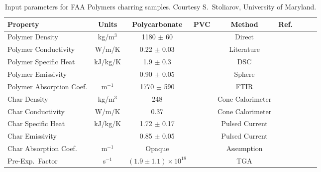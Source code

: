 \begin{table}[h!]
\caption[FAA charring polymer properties.]{Input parameters for FAA Polymers charring samples. Courtesy S.~Stoliarov, University of Maryland.}
\begin{tabular}{|l|c|c|c|c|c|c|l|l|}
\hline
Property                    & Units         & Polycarbonate                     & PVC                   & Method                &  Ref.                    \\ \hline \hline
Polymer Density             & kg/m$^3$      & 1180 $\pm$ 60                     &                       & Direct                &  \cite{Stoliarov:CF2010}  \\ \hline
Polymer Conductivity        & W/m/K         & 0.22 $\pm$ 0.03                   &                       & Literature            &  \cite{Stoliarov:CF2010}  \\ \hline
Polymer Specific Heat       & kJ/kg/K       & 1.9 $\pm$ 0.3                     &                     & DSC                   &  \cite{Stoliarov:PDS2008}  \\ \hline
Polymer Emissivity          &               & 0.90 $\pm$ 0.05                   &                     & Sphere                &  \cite{Hallman:PES1974}  \\ \hline
Polymer Absorption Coef.    & m$^{-1}$      & 1770 $\pm$ 590                    &                     & FTIR                  &  \cite{Tsilingiris:ECM2003}  \\ \hline
Char Density                & kg/m$^3$      & 248                               &                       & Cone Calorimeter      &  \cite{Stoliarov:CF2010}  \\ \hline
Char Conductivity           & W/m/K         & 0.37                              &                      & Cone Calorimeter      &  \cite{Stoliarov:CF2010}  \\ \hline
Char Specific Heat          & kJ/kg/K       & 1.72 $\pm$ 0.17                   &                    & Pulsed Current        &  \cite{Stoliarov:CF2010,Matsumoto:1996}  \\ \hline
Char Emissivity             &               & 0.85 $\pm$ 0.05                   &                       & Pulsed Current        &  \cite{Stoliarov:CF2010,Matsumoto:1996}  \\ \hline
Char Absorption Coef.       & m$^{-1}$      & Opaque                            &                     & Assumption            &  \cite{Stoliarov:CF2010}  \\ \hline
Pre-Exp.~Factor             & s$^{-1}$      & $(1.9 \pm 1.1) \times 10^{18}$    &                      & TGA                   &  \cite{Stoliarov:CF2010}  \\ \hline

\end{tabular}
\end{table}
